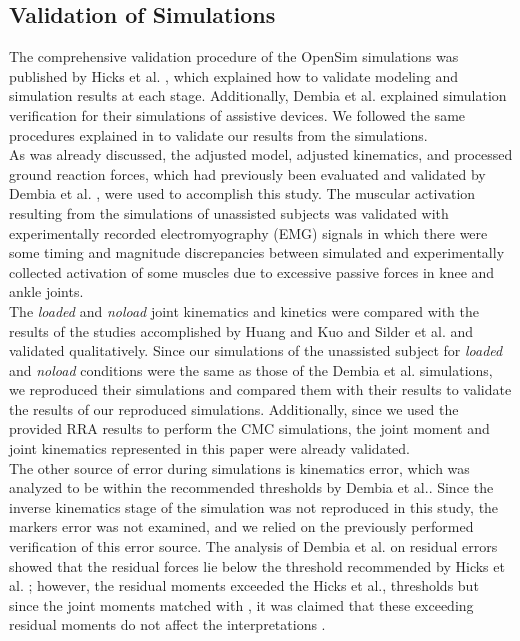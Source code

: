 \documentclass[10pt,letterpaper]{article}
\begin{document}
\subsection*{Validation of Simulations}
The comprehensive validation procedure of the OpenSim simulations was published by Hicks et al. \cite{92}, which explained how to validate modeling and simulation results at each stage. Additionally, Dembia et al. \cite{93} explained simulation verification for their simulations of assistive devices. We followed the same procedures explained in \cite{92,93} to validate our results from the simulations.\\
As was already discussed, the adjusted model, adjusted kinematics, and processed ground reaction forces, which had previously been evaluated and validated by Dembia et al. \cite{93}, were used to accomplish this study. The muscular activation resulting from the simulations of unassisted subjects was validated with experimentally recorded electromyography (EMG) signals \cite{92,93} in which there were some timing and magnitude discrepancies between simulated and experimentally collected activation of some muscles due to excessive passive forces in knee and ankle joints.\\
The \textit{loaded} and \textit{\textit{noload}} joint kinematics and kinetics were compared with the results of the studies accomplished by Huang and Kuo \cite{131} and Silder et al.\cite{132} and validated qualitatively. Since our simulations of the unassisted subject for \textit{loaded} and \textit{noload} conditions were the same as those of the Dembia et al. simulations, we reproduced their simulations and compared them with their results to validate the results of our reproduced simulations. Additionally, since we used the provided RRA results to perform the CMC simulations, the joint moment and joint kinematics represented in this paper were already validated.\\
The other source of error during simulations is kinematics error, which was analyzed to be within the recommended thresholds by Dembia et al.\cite{93}. Since the inverse kinematics stage of the simulation was not reproduced in this study, the markers error was not examined, and we relied on the previously performed verification of this error source. The analysis of Dembia et al. \cite{93} on residual errors showed that the residual forces lie below the threshold recommended by Hicks et al. \cite{92}; however, the residual moments exceeded the Hicks et al., thresholds but since the joint moments matched with \cite{92}, it was claimed that these exceeding residual moments do not affect the interpretations \cite{131,132}.
\end{document}
